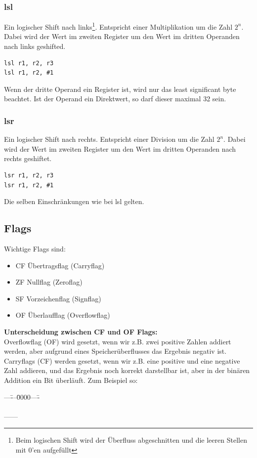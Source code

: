 \documentclass[a4paper,12pt,leqno]{article}
\begin{document}
\subsubsection{lsl}
Ein logischer Shift nach links\footnote{Beim logischen Shift wird der Überfluss abgeschnitten und die leeren Stellen mit 0'en aufgefüllt}. Entspricht einer Multiplikation um die Zahl $2^n$. Dabei wird der Wert im zweiten Register um den Wert im dritten Operanden nach links geshifted.
\begin{lstlisting}
lsl r1, r2, r3
lsl r1, r2, #1
\end{lstlisting}
Wenn der dritte Operand ein Register ist, wird nur das least significant byte beachtet. Ist der Operand ein Direktwert, so darf dieser maximal 32 sein.

\subsubsection{lsr}
Ein logischer Shift nach rechts. Entspricht einer Division um die Zahl $2^n$. Dabei wird der Wert im zweiten Register um den Wert im dritten Operanden nach rechts geshiftet.
\begin{lstlisting}
lsr r1, r2, r3
lsr r1, r2, #1
\end{lstlisting}
Die selben Einschränkungen wie bei lsl gelten.

\subsection{Flags}
Wichtige Flags sind:
\begin{itemize}
\item CF Übertragsflag (Carryflag)
\item ZF Nullflag (Zeroflag)
\item SF Vorzeichenflag (Signflag)
\item OF Überlaufflag (Overflowflag)
\end{itemize}

\textbf{Unterscheidung zwischen CF und OF Flags:}\\
Overflowflag (OF) wird gesetzt, wenn wir z.B. zwei positive Zahlen addiert werden, aber aufgrund eines Speicherüberflusses das Ergebnis negativ ist.\\

Carryflags (CF) werden gesetzt, wenn wir z.B. eine positive und eine negative Zahl addieren, und das Ergebnis noch korrekt darstellbar ist, aber in der binären Addition ein Bit überläuft. Zum Beispiel so:
\begin{tabbing}
---\=---\=0000----\=\kill
\>\\
\>\\
\>\>------\\
\end{tabbing}
\end{document}

